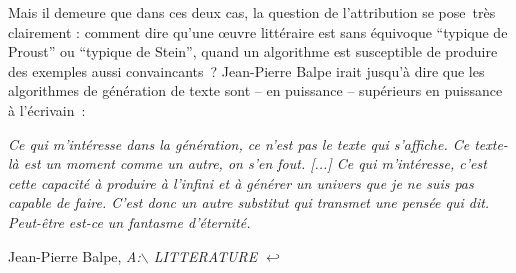 \documentclass{article}
\newenvironment{citationbox}
{\begin{center}
		\begin{minipage}{.8\textwidth}
		}
		{
		\end{minipage}	
\end{center}
}
\begin{document}
				Mais il demeure que dans ces deux cas, la question de l'attribution se pose très clairement : comment dire qu'une œuvre littéraire est sans équivoque ``typique de Proust'' ou ``typique de Stein'', quand un algorithme est susceptible de produire des exemples aussi convaincants ? Jean-Pierre Balpe irait jusqu'à dire que les algorithmes de génération de texte sont -- en puissance -- supérieurs en puissance à l'écrivain~:
				\begin{citationbox}
					\textit{Ce qui m’intéresse dans la génération, ce n’est pas le texte qui s’affiche. Ce texte-là est
				un moment comme un autre, on s’en fout. [...] Ce qui m’intéresse, c’est cette capacité à
				produire à l’infini et à générer un univers que je ne suis pas capable de faire. C’est donc un
				autre substitut qui transmet une pensée qui dit. Peut-être est-ce un fantasme d’éternité.}
					\begin{flushright}
						Jean-Pierre Balpe, \textit{A:{$\backslash$ LITTERATURE $\hookleftarrow$}}\cite{balpebootz1994}
					\end{flushright}
				\end{citationbox}

				
\end{document}
